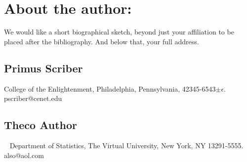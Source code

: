 \documentclass{article}
\begin{document}
\section*{About the author:}
   We would like a short biographical sketch,
   beyond just your affiliation to be placed
   after the bibliography.
   And below that, your full address.



\subsection*{Primus Scriber}
   College of the Enlightenment,
   Philadelphia, Pennsylvania, 42345-6543$\pm\epsilon$.
   pscriber@cenet.edu

\subsection*{Theco Author}~
   Department of Statistics,
   The Virtual University,
   New York, NY 13291-5555.
   also@aol.com
\end{document}
